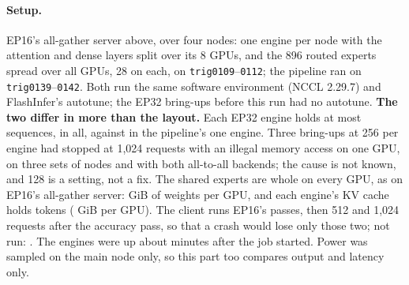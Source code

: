 \paragraph{Setup.} EP16's all-gather server above, over four nodes: one engine per node with the attention and dense layers split over its 8 GPUs, and the 896 routed experts spread over all \TriKxnFourGpus{} GPUs, 28 on each, on \texttt{trig0109}--\texttt{0112}; the pipeline ran on \texttt{trig0139}--\texttt{0142}. Both run the same software environment (NCCL 2.29.7) and FlashInfer's autotune; the EP32 bring-ups before this run had no autotune. \textbf{The two differ in more than the layout.} Each EP32 engine holds at most \TriKxnFourMaxSeqs{} sequences, \TriKxnFourHeld{} in all, against \TriKimiFourMaxSeqs{} in the pipeline's one engine. Three bring-ups at 256 per engine had stopped at 1,024 requests with an illegal memory access on one GPU, on three sets of nodes and with both all-to-all backends; the cause is not known, and 128 is a setting, not a fix. The shared experts are whole on every GPU, as on EP16's all-gather server: \TriKxnFourWeights{} GiB of weights per GPU, and each engine's KV cache holds \TriKxnFourKvTok{} tokens (\TriKxnFourKvGib{} GiB per GPU). The client runs EP16's passes, then 512 and 1,024 requests after the accuracy pass, so that a crash would lose only those two; not run: \TriKxnFourNotRun. The engines were up about \TriKxnFourUp{} minutes after the job started. Power was sampled on the main node only, so this part too compares output and latency only.

